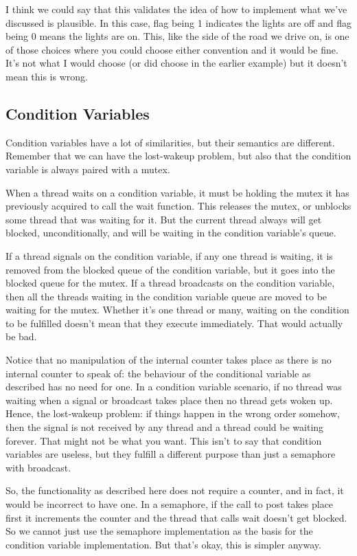 I think we could say that this validates the idea of how to implement what we've discussed is plausible. In this case, flag being 1 indicates the lights are off and flag being 0 means the lights are on. This, like the side of the road we drive on, is one of those choices where you could choose either convention and it would be fine. It's not what I would choose (or did choose in the earlier example) but it doesn't mean this is wrong.

\subsection*{Condition Variables}
Condition variables have a lot of similarities, but their semantics are different. Remember that we can have the lost-wakeup problem, but also that the condition variable is always paired with a mutex.

When a thread waits on a condition variable, it must be holding the mutex it has previously acquired to call the wait function. This releases the mutex, or unblocks some thread that was waiting for it. But the current thread always will get blocked, unconditionally, and will be waiting in the condition variable's queue.

If a thread signals on the condition variable, if any one thread is waiting, it is removed from the blocked queue of the condition variable, but it goes into the blocked queue for the mutex. If a thread broadcasts on the condition variable, then all the threads waiting in the condition variable queue are moved to be waiting for the mutex. Whether it's one thread or many, waiting on the condition to be fulfilled doesn't mean that they execute immediately. That would actually be bad.

Notice that no manipulation of the internal counter takes place as there is no internal counter to speak of: the behaviour of the conditional variable as described has no need for one. In a condition variable scenario, if no thread was waiting when a signal or broadcast takes place then no thread gets woken up. Hence, the lost-wakeup problem: if things happen in the wrong order somehow, then the signal is not received by any thread and a thread could be waiting forever. That might not be what you want. This isn't to say that condition variables are useless, but they fulfill a different purpose than just a semaphore with broadcast.

So, the functionality as described here does not require a counter, and in fact, it would be incorrect to have one. In a semaphore, if the call to post takes place first it increments the counter and the thread that calls wait doesn't get blocked. So we cannot just use the semaphore implementation as the basis for the condition variable implementation. But that's okay, this is simpler anyway.




